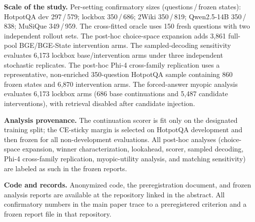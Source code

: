 \documentclass[10pt]{article}
\newcommand{\stitle}[1]{\vspace{0.4em}\noindent\textbf{#1}\hspace{0.6em}}
\begin{document}
\stitle{Scale of the study.}
Per-setting confirmatory sizes (questions\,/\,frozen states): HotpotQA dev
297\,/\,579; lockbox 350\,/\,686; 2Wiki 350\,/\,819; Qwen2.5-14B
350\,/\,838; MuSiQue 349\,/\,959. The cross-fitted oracle uses 150 fresh
questions with two independent rollout sets. The post-hoc choice-space
expansion adds 3{,}861 full-pool BGE/BGE-State intervention arms. The
sampled-decoding sensitivity evaluates 6{,}173 lockbox base/intervention
arms under three independent stochastic replicates. The post-hoc Phi-4
cross-family replication uses a representative, non-enriched 350-question
HotpotQA sample containing 860 frozen states and 6{,}870 intervention arms.
The forced-answer myopic analysis evaluates 6{,}173 lockbox arms (686 base
continuations and 5{,}487 candidate interventions), with retrieval disabled
after candidate injection.

\stitle{Analysis provenance.}
The continuation scorer is fit only on the designated training split; the
CE-sticky margin is selected on HotpotQA development and then frozen for
all non-development evaluations. All post-hoc analyses (choice-space
expansion, winner characterization, lookahead, scorer, sampled decoding,
Phi-4 cross-family replication, myopic-utility analysis, and matching
sensitivity) are labeled as such in the frozen reports.

\stitle{Code and records.}
Anonymized code, the preregistration document, and frozen analysis reports
are available at the repository linked in the abstract. All confirmatory
numbers in the main paper trace to a preregistered criterion and a frozen
report file in that repository.
\end{document}
